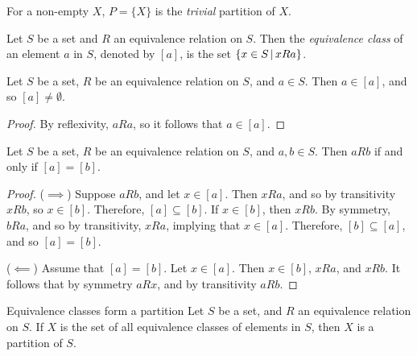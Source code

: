 \begin{defn}
    For a non-empty $X$, $P = \{X\}$ is the \emph{trivial} partition of $X$.
\end{defn}

\begin{defn}\label{equivalence-class}
    Let $S$ be a set and $R$ an equivalence relation on $S$. Then the \emph{equivalence class} of an element $a$ in $S$, denoted by $\left[a\right]$, is the set $\left\{x \in S \,\middle|\, x R a\right\}$.
\end{defn}

\begin{lemma}\label{equiv-class-non-empty}
    Let $S$ be a set, $R$ be an equivalence relation on $S$, and $a \in S$. Then $a \in [a]$, and so $[a] \neq \emptyset$.
\end{lemma}

\begin{proof}
    By reflexivity, $a R a$, so it follows that $a \in [a]$.
\end{proof}

\begin{lemma}\label{equiv-class-equal}
    Let $S$ be a set, $R$ be an equivalence relation on $S$, and $a, b \in S$. Then $a R b$ if and only if $[a] = [b]$.
\end{lemma}

\begin{proof}\proofbreak
    ($\implies$) Suppose $a R b$, and let $x \in [a]$. Then $x R a$, and so by transitivity $x R b$, so $x \in [b]$. Therefore, $[a] \subseteq [b]$. If $x \in [b]$, then $x R b$. By symmetry, $b R a$, and so by transitivity, $x R a$, implying that $x \in [a]$. Therefore, $[b] \subseteq [a]$, and so $[a] = [b]$.

    ($\impliedby$) Assume that $[a] = [b]$. Let $x \in [a]$. Then $x \in [b]$, $x R a$, and $x R b$. It follows that by symmetry $a R x$, and by transitivity $a R b$.
\end{proof}

\begin{thm}Equivalence classes form a partition\label{equiv-classes-form-partition}\proofbreak
    Let $S$ be a set, and $R$ an equivalence relation on $S$. If $X$ is the set of all equivalence classes of elements in $S$, then $X$ is a partition of $S$.
\end{thm}

